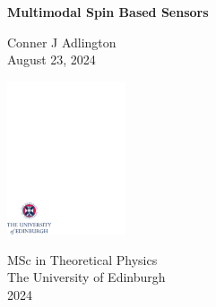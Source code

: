 \documentclass[
12pt,
a4paper,
]{report}
\begin{document}
\begin{titlepage}
\vspace*{0.1\textheight}

\begin{center}
        \huge{\bfseries Multimodal Spin Based Sensors}\\ %
\end{center}

\medskip

\begin{center}
        \Large{Conner J Adlington}\\  %
        \medskip
        \large{August 23, 2024}  %
\end{center}


\vspace*{0.3\textheight}

\begin{center}
        \includegraphics[width=35mm]{../crest.pdf}
\end{center}

\medskip

\begin{center}

\large{
  MSc in Theoretical Physics\\[0.8ex]
  The University of Edinburgh\\[0.8ex]
  2024}

\end{center}

\end{titlepage}
\end{document}
